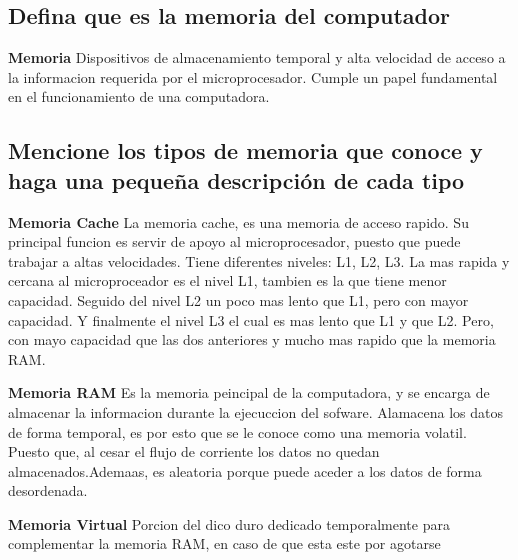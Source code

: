 \documentclass{article}
\begin{document}
\subsection{Defina que es la memoria del computador}


\begin{tcolorbox}[colupper=red!75!black]
	\textbf{Memoria}
	\tcblower
	Dispositivos de almacenamiento temporal y alta velocidad de acceso a la informacion requerida por el microprocesador. Cumple un papel fundamental en el funcionamiento de una computadora.
\end{tcolorbox}

\subsection{Mencione los tipos de memoria que conoce y haga una pequeña descripción de cada tipo}

\begin{tcolorbox}[colupper=red!75!black]
	\textbf{Memoria Cache}
	\tcblower
	La memoria cache, es una memoria de acceso rapido. Su principal funcion es servir de apoyo al microprocesador, puesto que puede trabajar a altas velocidades. Tiene diferentes niveles: L1, L2, L3. La mas rapida y cercana al microproceador es el nivel L1, tambien es la que tiene menor capacidad. Seguido del nivel L2 un poco mas lento que L1, pero con mayor capacidad. Y finalmente el nivel L3 el cual es mas lento que L1 y que L2. Pero, con mayo capacidad que las dos anteriores y mucho mas rapido que la memoria RAM.
\end{tcolorbox}

\begin{tcolorbox}[colupper=red!75!black]
	\textbf{Memoria RAM}
	\tcblower
	Es la memoria peincipal de la computadora, y se encarga de almacenar la informacion durante la ejecuccion del sofware. Alamacena los datos de forma temporal, es por esto que se le conoce como una memoria volatil. Puesto que, al cesar el flujo de corriente los datos no quedan almacenados.Ademaas, es aleatoria porque puede aceder a los datos de forma desordenada.
\end{tcolorbox}

\begin{tcolorbox}[colupper=red!75!black]
	\textbf{Memoria Virtual}
	\tcblower
	Porcion del dico duro dedicado temporalmente para complementar la memoria RAM, en caso de que esta este por agotarse
\end{tcolorbox}
\end{document}
